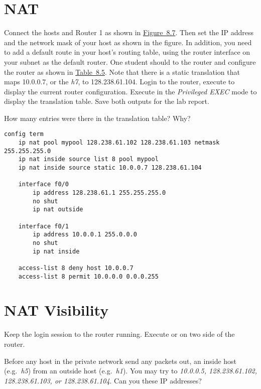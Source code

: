 \documentclass{../UTNetLab}
\begin{document}
\section{NAT}
Connect the hosts and Router 1 as shown in \hyperref[fig:8.7]{Figure~8.7}.
Then set the IP address and the network mask of your host as shown in the figure.
In addition, you need to add a default route in your host’s routing table, using the router interface on your subnet as the default router.
One student should  to the router and configure the router as shown in \hyperref[tab:8.5]{Table~8.5}.
Note that there is a static translation that maps 10.0.0.7, or the \textit{h7}, to 128.238.61.104.
Login to the router, execute  to display the current router configuration.
Execute  in the \textit{Privileged EXEC} mode to display the translation table.
Save both outputs for the lab report.

\begin{report}
    \item How many entries were there in the translation table? Why?
\end{report}

\begin{lstlisting}[language={cisco}, emph={mypool}, caption={NAT Router Configuration in \hyperref[fig:8.7]{Figure~8.7} (Table~8.5)\label{tab:8.5}}]
config term
    ip nat pool mypool 128.238.61.102 128.238.61.103 netmask 255.255.255.0
    ip nat inside source list 8 pool mypool
    ip nat inside source static 10.0.0.7 128.238.61.104

    interface f0/0
        ip address 128.238.61.1 255.255.255.0
        no shut
        ip nat outside

    interface f0/1
        ip address 10.0.0.1 255.0.0.0
        no shut
        ip nat inside

    access-list 8 deny host 10.0.0.7
    access-list 8 permit 10.0.0.0 0.0.0.255
    \end{lstlisting}

\section{NAT Visibility}
Keep the login session to the router running.
Execute  or  on two side of the router.

Before any host in the private network send any packets out,  an inside host (e.g.\ \textit{h5}) from an outside host (e.g.\ \textit{h1}).
You may try to  \textit{10.0.0.5, 128.238.61.102, 128.238.61.103, or 128.238.61.104}.
Can you  these IP addresses?
\end{document}
